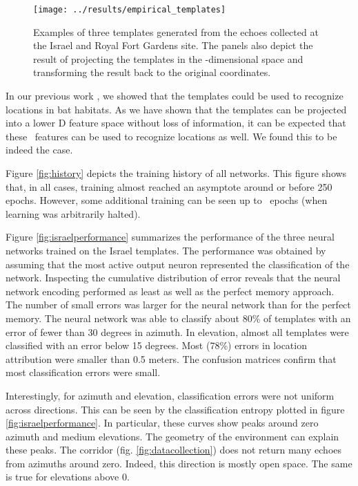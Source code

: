 \documentclass[preprint,5p]{elsarticle}
\begin{document}
\begin{figure}[tb]
	\centering
	\texttt{[image: ../results/empirical\_templates]}
	\caption{Examples of three templates generated from the echoes collected at the Israel and Royal Fort Gardens site. The panels also depict the result of projecting the templates in the 
		\pca-dimensional space and transforming the result back to the original coordinates.}
	\label{fig:empiricaltemplates}
\end{figure}

In our previous work \citep{Vanderelst2016}, we showed that the templates could be used to recognize locations in bat habitats. As we have shown that the templates can be projected into a lower \pca D feature space without loss of information, it can be expected that these \pca\ features can be used to recognize locations as well. We found this to be indeed the case.

Figure \ref{fig:history} depicts the training history of all networks. This figure shows that, in all cases, training almost reached an asymptote around or before 250 epochs. However, some additional training can be seen up to \Epochs\ epochs (when learning was arbitrarily halted).


Figure \ref{fig:israelperformance} summarizes the performance of the three neural networks trained on the Israel templates. The performance was obtained by assuming that the most active output neuron represented the classification of the network. Inspecting the cumulative distribution of error reveals that the neural network encoding performed as least as well as the perfect memory approach. The number of small errors was larger for the neural network than for the perfect memory. The neural network was able to classify about 80\% of templates with an error of fewer than 30 degrees in azimuth. In elevation, almost all templates were classified with an error below 15 degrees. Most (78\%) errors in location attribution were smaller than 0.5 meters. The confusion matrices confirm that most classification errors were small.

Interestingly, for azimuth and elevation, classification errors were not uniform across directions. This can be seen by the classification entropy plotted in figure \ref{fig:israelperformance}. In particular, these curves show peaks around zero azimuth and medium elevations. The geometry of the environment can explain these peaks. The corridor (fig. \ref{fig:datacollection}) does not return many echoes from azimuths around zero. Indeed, this direction is mostly open space. The same is true for elevations above 0.
\end{document}

